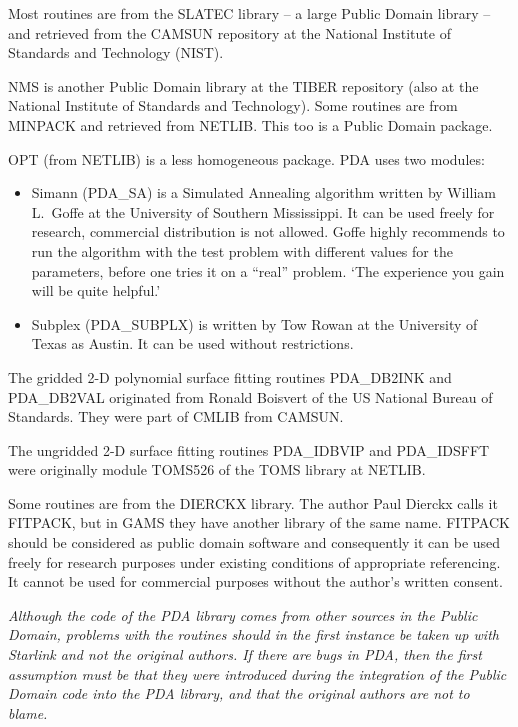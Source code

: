 \documentclass[11pt,twoside]{article}
\begin{document}
   Most routines are from the SLATEC library -- a large Public Domain
   library -- and retrieved from the CAMSUN repository at the National
   Institute of Standards and Technology (NIST).

   NMS is another Public Domain library at the TIBER repository (also at
   the National Institute of Standards and Technology).
   Some routines are from MINPACK and retrieved from NETLIB. This too is
   a Public Domain package.

   OPT (from NETLIB) is a less homogeneous package. PDA uses two modules:

\begin{itemize}
\item Simann (PDA\_SA) is a Simulated Annealing algorithm written by
   William L.\ Goffe at the University of Southern Mississippi. It can
   be used freely for research, commercial distribution is not allowed.
   Goffe highly recommends to run the
   algorithm with the test problem with different values for the
   parameters, before one tries it on a ``real'' problem. `The experience
   you gain will be quite helpful.'
\item Subplex (PDA\_SUBPLX) is written by Tow Rowan at the University of
   Texas as Austin. It can be used without restrictions.
\end{itemize}

The gridded 2-D polynomial surface fitting
routines PDA\_DB2INK and PDA\_DB2VAL originated from Ronald
Boisvert of the US National Bureau of Standards. They were
part of CMLIB from CAMSUN.

The ungridded 2-D surface fitting routines
PDA\_IDBVIP and PDA\_IDSFFT were originally
module TOMS526 of the TOMS library at NETLIB.

   Some routines are from the DIERCKX library. The author Paul Dierckx
   calls it FITPACK, but in GAMS they have another library of the same
   name. FITPACK should be considered
   as public domain software and consequently it can be used freely for
   research purposes under existing conditions of appropriate referencing.
   It cannot be used for commercial purposes without the author's
   written consent.

   {\em Although the code of the PDA library comes from other sources in
   the Public Domain, problems with the routines should in the first
   instance be taken up with Starlink and not the original authors. If
   there are bugs in PDA, then the first assumption must be that they
   were introduced during the integration of the Public Domain code into
   the PDA library, and that the original authors are not to blame.}
\end{document}
